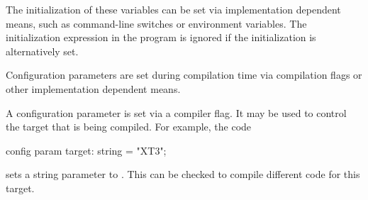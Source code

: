 The initialization of these variables can be set via implementation
dependent means, such as command-line switches or environment
variables.  The initialization expression in the program is ignored if
the initialization is alternatively set.

Configuration parameters are set during compilation time via
compilation flags or other implementation dependent means.
\begin{example}
A configuration parameter is set via a compiler flag.  It may be used
to control the target that is being compiled.  For example, the code
\begin{chapel}
config param target: string = "XT3";
\end{chapel}
sets a string parameter  to .  This can be
checked to compile different code for this target.
\end{example}
